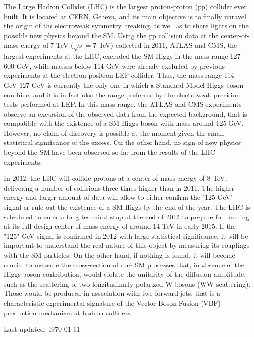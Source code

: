 \documentclass[10pt, a4paper]{article}
\begin{document}
The Large Hadron Collider (LHC) is the largest proton-proton (pp) collider ever built. 
It is located at CERN, Geneva, and its main objective is to finally unravel the origin 
of the electroweak symmetry breaking, as well as to share lights on the possible 
new physics beyond the SM. Using the pp collision data at the center-of-mass energy
of 7 TeV ($\sqrt{s}=7$ TeV) collected in 2011, ATLAS and CMS, the 
largest experiments at the LHC, excluded the SM Higgs in the mass range 
127-600 GeV, while masses below 114 GeV were already excluded by 
previous experiments at the electron-positron LEP collider. 
Thus, the mass range 114 GeV-127 GeV is currently the only one in which 
a Standard Model Higgs boson can hide, and it is in fact also the range 
preferred by the electroweak precision tests performed at LEP. 
In this mass range, the ATLAS and CMS experiments observe an excursion of 
the observed data from the expected background, that is compatible with the existence 
of a SM Higgs boson with mass around 125 GeV. However, no claim of 
discovery is possible at the moment given the small statistical significance of the excess. 
On the other hand, no sign of new physics beyond the SM have been observed so far
from the results of the LHC experiments.

In 2012, the LHC will collide protons at a center-of-mass energy of 8 TeV, delivering 
a number of collisions three times higher than in 2011. The higher energy and larger 
amount of data will allow to either confirm the "125 GeV" signal or rule out the existence 
of a SM Higgs by the end of the year. The LHC is scheduled to enter a 
long technical stop at the end of 2012 to prepare for running at its full design 
center-of-mass energy of around 14 TeV in early 2015.
If the "125" GeV signal is confirmed in 2012 with large statistical significance, 
it will be important to understand the real nature of this object 
by measuring its couplings with the SM particles. 
On the other hand, if nothing is found, it will become crucial 
to measure the cross-section of rare SM processes that, in absence of the 
Higgs boson contribution, would violate the unitarity of the diffusion amplitude, such 
as the scattering of two longitudinally polarized W bosons (WW scattering).
Those would be produced in association with two forward jets, that is a characteristic 
experimental signature of the Vector Boson Fusion (VBF) production mechanism at hadron colliders.


 

 
 
\vfill{}
\hrulefill

\begin{center}
{\footnotesize Last updated: \today}
\end{center}
\end{document}
